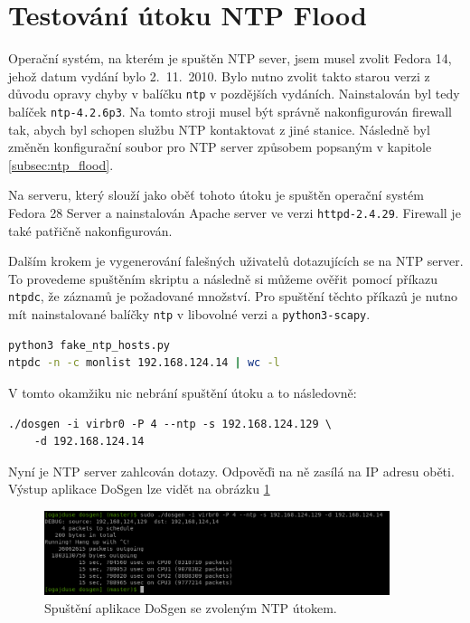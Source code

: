 \section{Testování útoku NTP Flood}
Operační systém, na kterém je spuštěn NTP sever, jsem musel zvolit Fedora 14, jehož datum vydání bylo 2.\ 11.\ 2010. Bylo nutno zvolit takto starou verzi z důvodu opravy chyby v balíčku \texttt{ntp} v pozdějších vydáních. Nainstalován byl tedy balíček \texttt{ntp-4.2.6p3}. Na tomto stroji musel být správně nakonfigurován firewall tak, abych byl schopen službu NTP kontaktovat z jiné stanice. Následně byl změněn konfigurační soubor pro NTP server způsobem popsaným v kapitole \ref{subsec:ntp_flood}.

Na serveru, který slouží jako oběť tohoto útoku je spuštěn operační systém Fedora 28 Server a nainstalován Apache server ve verzi \texttt{httpd-2.4.29}. Firewall je také patřičně nakonfigurován.

Dalším krokem je vygenerování falešných uživatelů dotazujících se na NTP server. To provedeme spuštěním skriptu a následně si můžeme ověřit pomocí příkazu \texttt{ntpdc}, že záznamů je požadované množství. Pro spuštění těchto příkazů je nutno mít nainstalované balíčky \texttt{ntp} v libovolné verzi a \texttt{python3-scapy}.

\begin{lstlisting}[language=bash]
python3 fake_ntp_hosts.py
ntpdc -n -c monlist 192.168.124.14 | wc -l
\end{lstlisting}

\newpage

\noindent V tomto okamžiku nic nebrání spuštění útoku a to následovně:
\begin{lstlisting}
./dosgen -i virbr0 -P 4 --ntp -s 192.168.124.129 \
	-d 192.168.124.14
\end{lstlisting}

Nyní je NTP server zahlcován dotazy. Odpověďi na ně zasílá na IP adresu oběti. Výstup aplikace DoSgen lze vidět na obrázku \ref{fig:dosgen_run_ntp-img}

\begin{figure} [ht]
	\centering
	\includegraphics[width=0.9\textwidth]{obrazky/dosgen_terminal_run_ntp.png}
	\caption{Spuštění aplikace DoSgen se zvoleným NTP útokem.}
	\label{fig:dosgen_run_ntp-img}
\end{figure}

